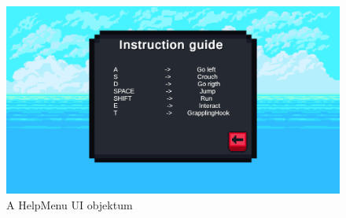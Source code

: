\begin{figure}[ht]
\centering
\includegraphics[width =0.9 \textwidth]{images/helpmenu}
\caption{A HelpMenu UI objektum}
\label{fig:helpmenu}
\end{figure}





